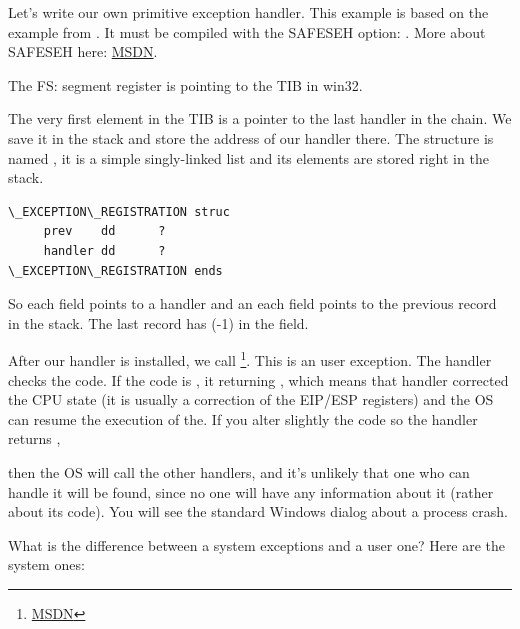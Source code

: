 Let's write our own primitive exception handler.
This example is based on the example from \PietrekSEH.
It must be compiled with the SAFESEH option: .
More about SAFESEH here: \href{http://go.yurichev.com/17252}{MSDN}.



The FS: segment register is pointing to the \ac{TIB} in win32.

The very first element in the \ac{TIB} is a pointer to the last handler in the chain.
We save it in the stack and store the address of our handler there.
The structure is named , it is a simple singly-linked list and its elements are stored right in the stack.

\begin{lstlisting}[caption=MSVC/VC/crt/src/exsup.inc]
\_EXCEPTION\_REGISTRATION struc
     prev    dd      ?
     handler dd      ?
\_EXCEPTION\_REGISTRATION ends
\end{lstlisting}

So each  field points to a handler and an each  field points to the previous record in the stack.
The last record has  (-1) in the  field.



After our handler is installed, we call 
\footnote{\href{http://go.yurichev.com/17253}{MSDN}}.
This is an user exception. 
The handler checks the code.
If the code is , it returning ,
which means that handler corrected the CPU state (it is usually a correction of the EIP/ESP registers) and the \ac{OS} can resume the execution of the.
If you alter slightly the code so the handler returns ,

then the \ac{OS} will call the other handlers, and it's unlikely that one who can handle it will be found, since
no one will have any information about it (rather about its code).
You will see the standard Windows dialog about a process crash.

What is the difference between a system exceptions and a user one? Here are the system ones:

